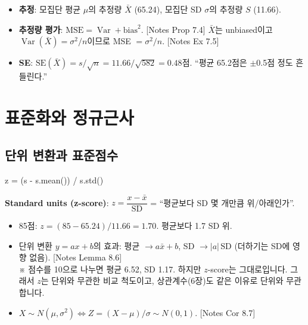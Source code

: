 \documentclass[11pt,a4paper]{article}
\newcommand{\Var}{\operatorname{Var}}
\newcommand{\SD}{\mathrm{SD}}
\newcommand{\SE}{\mathrm{SE}}
\newcommand{\term}[1]{\textbf{#1}}
\newcommand{\nref}[1]{{\footnotesize\textsf{\color{blue!55!black}[Notes #1]}}}
\newcommand{\aside}[1]{{\footnotesize\color{black!65}#1}}
\begin{document}
\begin{hypbox}
\begin{itemize}
\item \textbf{추정}: 모집단 평균 $\mu$의 추정량 $\bar X$ (65.24), 모집단 SD $\sigma$의 추정량 $S$ (11.66).
\item \textbf{추정량 평가}: $\text{MSE}=\Var+\text{bias}^2$. \nref{Prop 7.4} $\bar X$는 unbiased이고 $\Var(\bar X)=\sigma^2/n$이므로 MSE $=\sigma^2/n$. \nref{Ex 7.5}
\item \textbf{SE}: $\SE(\bar X)=s/\sqrt n=11.66/\sqrt{582}=0.48$점. ``평균 65.2점은 $\pm$0.5점 정도 흔들린다.''
\end{itemize}
\end{hypbox}

\section{표준화와 정규근사}

\subsection{단위 변환과 표준점수}
\begin{codebox}
z = (s - s.mean()) / s.std()
\end{codebox}
\term{Standard units (z-score)}: $z=\dfrac{x-\bar x}{\SD}$ = ``평균보다 SD 몇 개만큼 위/아래인가''.
\begin{itemize}
\item 85점: $z=(85-65.24)/11.66=1.70$. 평균보다 1.7 SD 위.
\item 단위 변환 $y=ax+b$의 효과: 평균 $\to a\bar x+b$, SD $\to|a|\,\SD$ (더하기는 SD에 영향 없음). \nref{Lemma 8.6}\\
\aside{※ 점수를 10으로 나누면 평균 6.52, SD 1.17. 하지만 $z$-score는 그대로입니다. 그래서 $z$는 단위와 무관한 비교 척도이고, 상관계수(6장)도 같은 이유로 단위와 무관합니다.}
\item $X\sim N(\mu,\sigma^2)\iff Z=(X-\mu)/\sigma\sim N(0,1)$. \nref{Cor 8.7}
\end{itemize}
\end{document}
